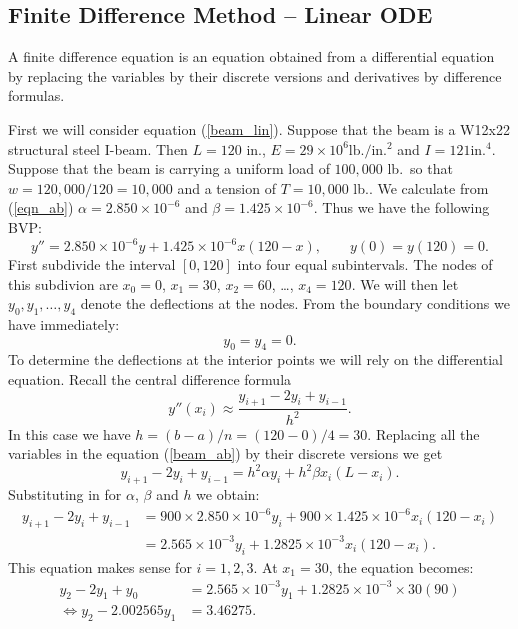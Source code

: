 
\subsection*{Finite Difference Method -- Linear ODE}

A finite difference equation is an equation
obtained from a differential equation by replacing
the variables by their discrete versions and
derivatives by difference formulas.

First we will consider equation (\ref{beam_lin}). Suppose that the
beam is a W12x22 structural steel I-beam.  Then $L = 120$ in., $E = 29
\times 10^6 \textrm{lb.}/\textrm{in.}^2$ and $I = 121
\textrm{in.}^4$. Suppose that the beam is carrying a uniform load of $100,000$
lb.\ so that $w = 120,000/120 = 10,000$ and a tension of $T = 10,000$
lb.. We calculate from (\ref{eqn_ab}) $\alpha = 2.850
\times 10^{-6}$ and $\beta = 1.425 \times 10^{-6}$.  Thus we have the
following BVP:
\begin{equation}\label{beam_sim}
  y'' = 2.850 \times 10^{-6} y + 1.425 \times 10^{-6}x(120-x), \qquad y(0) = y(120) = 0.
\end{equation}
First subdivide the interval $[0,120]$ into four equal
subintervals. The nodes of this subdivion
are $x_0 = 0$, $x_1 = 30$, $x_2 = 60$, \ldots, $x_4 = 120$.
We will then let $y_0, y_1, \ldots, y_4$ denote the deflections
at the nodes. From the boundary conditions we have immediately:
$$
   y_0 = y_4 = 0.
$$
To determine the deflections at the interior points we will rely
on the differential equation. Recall the central difference formula
$$
   y''(x_i) \approx \frac{y_{i+1} - 2 y_i + y_{i-1}}{h^2}.
$$
In this case we have $h = (b-a)/n =(120-0)/4= 30$. Replacing all the variables
in the equation (\ref{beam_ab}) by their discrete versions we get
$$
     y_{i+1} - 2 y_i + y_{i-1} = h^2 \alpha y_i + h^2 \beta x_i (L-x_i).
$$
Substituting in for $\alpha$, $\beta$ and $h$ we obtain:
\begin{equation*}
 \begin{split}
     y_{i+1} - 2 y_i + y_{i-1} 
     &= 900 \times 2.850 \times 10^{-6} y_i
     + 900 \times 1.425 \times 10^{-6} x_i(120 - x_i) \\
     &= 2.565 \times 10^{-3} y_i + 1.2825 \times 10^{-3} x_i(120 - x_i).
  \end{split}
\end{equation*}
This equation makes sense for $i = 1,2,3$. At $x_1 = 30$, the equation
becomes:
\begin{equation}
\begin{split}
  y_2 - 2y_1 + y_0
  &= 2.565 \times 10^{-3} y_1+ 1.2825 \times 10^{-3} \times 30(90)\\
  \Leftrightarrow      y_2 -  2.002565 y_1 & = 3.46275.
\end{split}
\end{equation}
